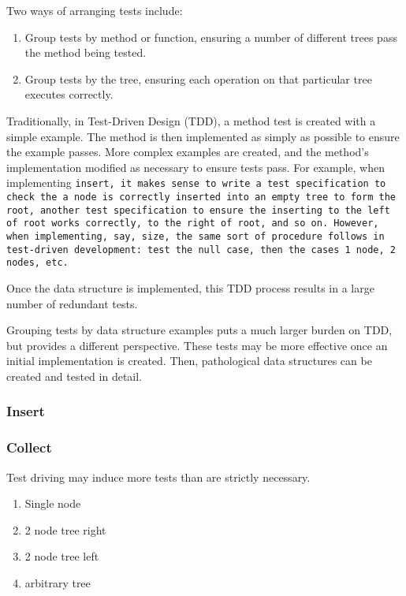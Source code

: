 \documentclass{article}
\begin{document}
Two ways of arranging tests include:
\begin{enumerate}
\item Group tests by method or function, ensuring a number of different
trees pass the method being tested.
\item Group tests by the tree, ensuring each operation on that particular tree
executes correctly.
\end{enumerate}

Traditionally, in Test-Driven Design (TDD), a method test is created with a simple example.
The method is then implemented as simply as possible to ensure the example passes.
More complex examples are created, and the method's implementation modified as necessary
to ensure tests pass. For example, when implementing \tt{insert}, it makes sense
to write a test specification to check the a node is correctly inserted into an
empty tree to form the root, another test specification to ensure the inserting
to the left of root works correctly, to the right of root, and so on. However,
when implementing, say, \tt{size}, the same sort of procedure follows in test-driven
development: test the null case, then the cases 1 node, 2 nodes, etc.

Once the data structure is implemented, this TDD process results in a large number
of redundant tests.

Grouping tests by data structure examples puts a much larger burden on TDD,
but provides a different perspective. These tests may be more effective once an
initial implementation is created. Then, pathological data structures can be
created and tested in detail.

\subsubsection{Insert}



\subsubsection{Collect}

Test driving may induce more tests than are strictly necessary.

\begin{enumerate}
\item Single node
\item 2 node tree right
\item 2 node tree left
\item arbitrary tree
\end{enumerate}
\end{document}
